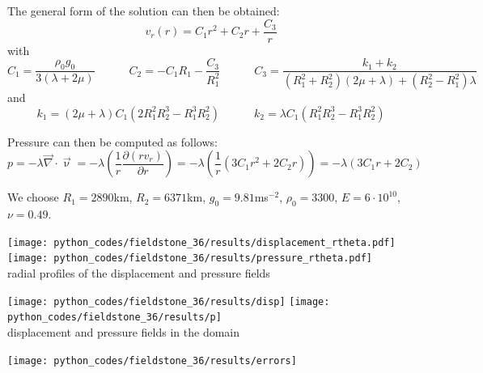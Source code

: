 The general form of the solution can then be obtained:
\begin{equation}
v_r(r)=C_1 r^2 + C_2 r + \frac{C_3}{r}
\end{equation}
with 
\begin{equation}
C_1=\frac{\rho_0 g_0}{3(\lambda+2\mu)}
\quad
\quad
\quad
C_2=-C_1 R_1-\frac{C_3}{R_1^2}
\quad
\quad
\quad
C_3=\frac{k_1+k_2}{(R_1^2+R_2^2)(2\mu+\lambda)+(R_2^2-R_1^2)\lambda}
\end{equation}
and
\begin{equation}
k_1=(2\mu+\lambda) C_1 (2 R_1^2  R_2^3 - R_1^3  R_2^2)
\quad
\quad
\quad
k_2 = \lambda  C_1 (R_1^2  R_2^3 - R_1^3  R_2^2)
\end{equation}

Pressure can then be computed as follows: 
\begin{equation}
p=-\lambda {\vec \nabla}\cdot {\vec \upnu}
= -\lambda \left( \frac{1}{r} \frac{\partial (r v_r)}{\partial r} \right)
= -\lambda \left( \frac{1}{r} ( 3C_1r^2 + 2C_2r  )\right)
= -\lambda ( 3C_1r + 2C_2  )
\end{equation}

We choose $R_1=2890$km, $R_2=6371$km, $g_0=9.81$ms$^{-2}$, $\rho_0=3300$, 
$E=6\cdot10^{10}$, $\nu=0.49$.

\begin{center}
\texttt{[image: python\_codes/fieldstone\_36/results/displacement\_rtheta.pdf]}
\texttt{[image: python\_codes/fieldstone\_36/results/pressure\_rtheta.pdf]}\\
{\captionfont radial profiles of the displacement and pressure fields}
\end{center}

\begin{center}
\texttt{[image: python\_codes/fieldstone\_36/results/disp]}
\texttt{[image: python\_codes/fieldstone\_36/results/p]}\\
{\captionfont displacement and pressure fields in the domain}
\end{center}

\begin{center}
\texttt{[image: python\_codes/fieldstone\_36/results/errors]}
\end{center}

